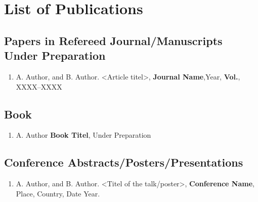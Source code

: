 \chapter*{List of Publications}
\section*{Papers in Refereed Journal/Manuscripts Under Preparation }
\begin{enumerate}
    \item A. Author, and B. Author. <Article titel>, \textbf{Journal Name},Year, \textbf{Vol.}, XXXX--XXXX 
\end{enumerate}

\section*{Book}
\begin{enumerate}
    \item A. Author \textbf{Book Titel}, Under Preparation
\end{enumerate}

\section*{Conference Abstracts/Posters/Presentations}
\begin{enumerate}
    \item A. Author, and B. Author. <Titel of the talk/poster>, \textbf{Conference Name}, Place, Country, Date Year.
\end{enumerate}